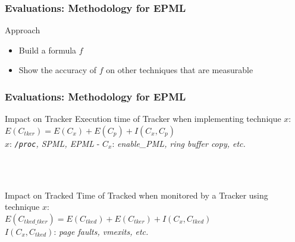 \documentclass[xcolor=table,bigger,unknownkeysallowed]{beamer}
\begin{document}
\begin{frame}
	\frametitle{Evaluations: Methodology for EPML}
	Approach
	\begin{itemize}
		\item Build a formula $f$
		\item Show the accuracy of $f$ on other techniques that are measurable
	\end{itemize}
\end{frame}
\begin{frame}
	\frametitle{Evaluations: Methodology for EPML}
	\begin{block}{Impact on Tracker}
		Execution time of Tracker when implementing technique $x$:\\
		$E(C_{tker}) = E(C_{x}) + E(C_{p}) + I(C_{x},C_{p})$
		~\\
		$x$: \textit{\texttt{/proc}, SPML, EPML} -
		$C_{x}$: \textit{enable\_PML, ring buffer copy, etc.}
	\end{block} 
~\\~\\
	\begin{block}{Impact on Tracked}
		Time of Tracked when monitored by a Tracker using technique $x$:\\
		$E(C_{tked\_tker}) = E(C_{tked}) + E(C_{tker}) + I(C_{x},C_{tked})$
		~\\
		$I(C_{x},C_{tked})$: \textit{page faults, vmexits, etc.}
	\end{block}
\end{frame}                                                                              
\end{document}
